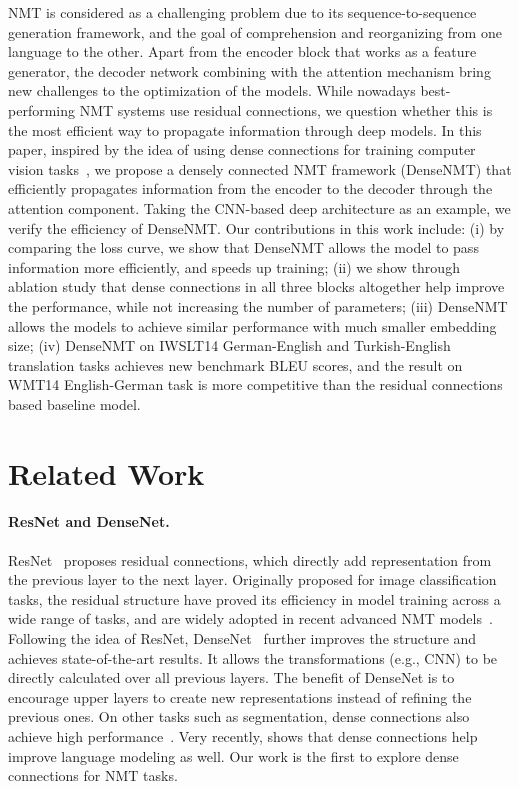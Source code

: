 \documentclass[11pt,a4paper]{article}
\begin{document}
NMT is considered as a challenging problem due to its sequence-to-sequence generation framework, and the goal of comprehension and reorganizing from one language to the other. 
Apart from the encoder block that works as a feature generator, the decoder network combining with the attention mechanism bring new challenges to the optimization of the models. 
While nowadays best-performing NMT systems use residual connections, we question whether this is the most efficient way to propagate information through deep models. 
In this paper, inspired by the idea of using dense connections for training computer vision tasks~\cite{densenet}, we propose a densely connected NMT framework (DenseNMT) that efficiently propagates information from the encoder to the decoder through the attention component. 
Taking the CNN-based deep architecture as an example, we verify the efficiency of DenseNMT. Our contributions in this work include:
(i) by comparing the loss curve, we show that DenseNMT allows the model to pass information more efficiently, and speeds up training; 
(ii) we show through ablation study that dense connections in all three blocks altogether help improve the performance, while not increasing the number of parameters; 
(iii) DenseNMT allows the models to achieve similar performance with much smaller embedding size; 
(iv) DenseNMT on IWSLT14 German-English and Turkish-English translation tasks achieves new benchmark BLEU scores, and the result on WMT14 English-German task is more competitive than the residual connections based baseline model.


\section{Related Work}
\paragraph{ResNet and DenseNet. }
ResNet~\cite{resnet} proposes residual connections, which directly add representation from the previous layer to the next layer. Originally proposed for image classification tasks, the residual structure have proved its efficiency in model training across a wide range of tasks, and are widely adopted in recent advanced NMT models~\cite{gnmt,transformer,convs2s}. 
Following the idea of ResNet, DenseNet~\cite{densenet} further improves the structure and achieves state-of-the-art results. It allows the transformations (e.g., CNN) to be directly calculated over all previous layers. The benefit of DenseNet is to encourage upper layers to create new representations instead of refining the previous ones. 
On other tasks such as segmentation, dense connections also achieve high performance~\cite{jegou2017one}. 
Very recently, \cite{godin2017improving} shows that dense connections help improve language modeling as well. 
Our work is the first to explore dense connections for NMT tasks.
\end{document}
